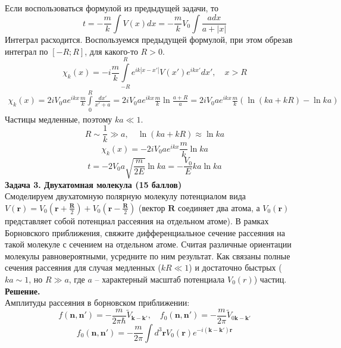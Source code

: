 \documentclass[12pt]{article}
\theoremstyle{definition}
\begin{document}
Если воспользоваться формулой из предыдущей задачи, то
\begin{equation}
    t=-\frac{m}{k}\int V(x)dx=-\frac{m}{k}V_0\int\frac{adx}{a+|x|}
\end{equation}
Интеграл расходится. Воспользуемся предыдущей формулой, при этом обрезав интеграл по $[-R;R]$, для какого-то $R>0$.
\begin{equation}
    \chi_{k}(x)=-i\frac{m}{k}\int\limits_{-R}^{R}e^{ik|x-x'|}V(x')e^{ikx'}dx', \quad x>R
\end{equation}
\begin{multline}
    \chi_{k}(x)=2iV_0ae^{ikx}\frac{m}{k}\int\limits_0^R\frac{dx'}{x'+a}=2iV_{0}ae^{ikx}\frac{m}{k}\ln\frac{a+R}{a}=2iV_{0}ae^{ikx}\frac{m}{k}(\ln(ka+kR)-\ln ka)
\end{multline}
Частицы медленные, поэтому $ka\ll1$.
\begin{equation}
    R\sim\frac{1}{k}\gg a,\quad \ln(ka+kR)\approx\ln ka
\end{equation}
\begin{equation}
    \chi_{k}(x)=-2iV_{0}ae^{ikx}\frac{m}{k}\ln ka
\end{equation}
\begin{equation}
    \boxed{t=-2V_0a\sqrt{\frac{m}{2E}}\ln ka=-\frac{V_0}{E}ka\ln ka}
\end{equation}
\textbf{Задача 3. Двухатомная молекула (15 баллов)}\\
Смоделируем двухатомную полярную молекулу потенциалом вида $V (\textbf{r}) = V_0(\textbf{r} + \frac{\textbf{R}}{2}) + V_0(\textbf{r}-\frac{\textbf{R}}{2})$ (вектор $\textbf{R}$ соединяет
два атома, а $V_0(\textbf{r})$ представляет собой потенциал рассеяния на отдельном атоме). В рамках Борновского приближения,
свяжите дифференциальное сечение рассеяния на такой молекуле с сечением на отдельном атоме. Считая различные
ориентации молекулы равновероятными, усредните по ним результат. Как связаны полные сечения рассеяния для случая
медленных ($kR \ll 1$) и достаточно быстрых ($ka \sim 1$, но $R\gg a$, где $a$ -- характерный масштаб потенциала $V_0(r)$) частиц.\\
\textbf{Решение.}\\
Амплитуды рассеяния в борновском приближении:
\begin{equation}
    f(\textbf{n},\textbf{n}')=-\frac{m}{2\pi\hbar}\tilde{V}_{\textbf{k}-\textbf{k}'},\quad f_0(\textbf{n},\textbf{n}')=-\frac{m}{2\pi}\tilde{V}_{0\textbf{k}-\textbf{k}'}
\end{equation}
\begin{equation}
    f_0(\textbf{n},\textbf{n}')=-\frac{m}{2\pi}\int d^3\textbf{r}V_0(\textbf{r})e^{-i(\textbf{k}-\textbf{k}')\textbf{r}}
\end{equation}
\end{document}
